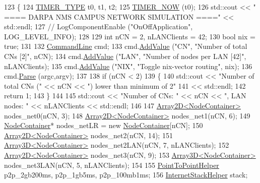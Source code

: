 \begin{DoxyCode}
123 \{
124   \hyperlink{nms-p2p-nix-distributed_8cc_adfc7b6dfe70e564fc379bd23c8e5b488}{TIMER\_TYPE} t0, t1, t2;
125   \hyperlink{nms-p2p-nix_8cc_a4ea1f7c69e863076962d247fee766870}{TIMER\_NOW} (t0);
126   std::cout << \textcolor{stringliteral}{" ==== DARPA NMS CAMPUS NETWORK SIMULATION ===="} << std::endl;
127   \textcolor{comment}{// LogComponentEnable ("OnOffApplication", LOG\_LEVEL\_INFO);}
128 
129   \textcolor{keywordtype}{int} nCN = 2, nLANClients = 42;
130   \textcolor{keywordtype}{bool} nix = \textcolor{keyword}{true};
131 
132   \hyperlink{classns3_1_1CommandLine}{CommandLine} cmd;
133   cmd.\hyperlink{classns3_1_1CommandLine_addcfb546c7ad4c8bd0965654d55beb8e}{AddValue} (\textcolor{stringliteral}{"CN"}, \textcolor{stringliteral}{"Number of total CNs [2]"}, nCN);
134   cmd.\hyperlink{classns3_1_1CommandLine_addcfb546c7ad4c8bd0965654d55beb8e}{AddValue} (\textcolor{stringliteral}{"LAN"}, \textcolor{stringliteral}{"Number of nodes per LAN [42]"}, nLANClients);
135   cmd.\hyperlink{classns3_1_1CommandLine_addcfb546c7ad4c8bd0965654d55beb8e}{AddValue} (\textcolor{stringliteral}{"NIX"}, \textcolor{stringliteral}{"Toggle nix-vector routing"}, nix);
136   cmd.\hyperlink{classns3_1_1CommandLine_a5c10b85b3207e5ecb48d907966923156}{Parse} (argc,argv);
137 
138   \textcolor{keywordflow}{if} (nCN < 2) 
139     \{
140       std::cout << \textcolor{stringliteral}{"Number of total CNs ("} << nCN << \textcolor{stringliteral}{") lower than minimum of 2"}
141            << std::endl;
142       \textcolor{keywordflow}{return} 1;
143     \}
144 
145   std::cout << \textcolor{stringliteral}{"Number of CNs: "} << nCN << \textcolor{stringliteral}{", LAN nodes: "} << nLANClients << std::endl;
146 
147   \hyperlink{classArray2D}{Array2D<NodeContainer>} nodes\_net0(nCN, 3);
148   \hyperlink{classArray2D}{Array2D<NodeContainer>} nodes\_net1(nCN, 6);
149   \hyperlink{classns3_1_1NodeContainer}{NodeContainer}* nodes\_netLR = \textcolor{keyword}{new} \hyperlink{classns3_1_1NodeContainer}{NodeContainer}[nCN];
150   \hyperlink{classArray2D}{Array2D<NodeContainer>} nodes\_net2(nCN, 14);
151   \hyperlink{classArray3D}{Array3D<NodeContainer>} nodes\_net2LAN(nCN, 7, nLANClients);
152   \hyperlink{classArray2D}{Array2D<NodeContainer>} nodes\_net3(nCN, 9);
153   \hyperlink{classArray3D}{Array3D<NodeContainer>} nodes\_net3LAN(nCN, 5, nLANClients);
154 
155   \hyperlink{classns3_1_1PointToPointHelper}{PointToPointHelper} p2p\_2gb200ms, p2p\_1gb5ms, p2p\_100mb1ms;
156   \hyperlink{classns3_1_1InternetStackHelper}{InternetStackHelper} stack;

\end{DoxyCode}
